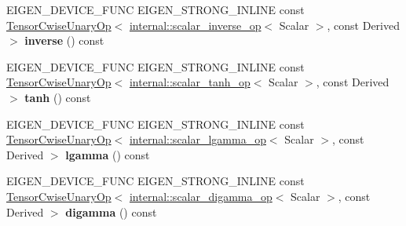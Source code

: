 \begin{DoxyCompactItemize}
\mbox{\label{class_eigen_1_1_tensor_base_3_01_derived_00_01_read_only_accessors_01_4_a6001679417b6e053206f7a92e91435bb}} 
E\+I\+G\+E\+N\+\_\+\+D\+E\+V\+I\+C\+E\+\_\+\+F\+U\+NC E\+I\+G\+E\+N\+\_\+\+S\+T\+R\+O\+N\+G\+\_\+\+I\+N\+L\+I\+NE const \hyperlink{class_eigen_1_1_tensor_cwise_unary_op}{Tensor\+Cwise\+Unary\+Op}$<$ \hyperlink{struct_eigen_1_1internal_1_1scalar__inverse__op}{internal\+::scalar\+\_\+inverse\+\_\+op}$<$ Scalar $>$, const Derived $>$ {\bfseries inverse} () const
\item 
\mbox{\label{class_eigen_1_1_tensor_base_3_01_derived_00_01_read_only_accessors_01_4_ad78e81fa292b9a37ad3fbef8fae10f6c}} 
E\+I\+G\+E\+N\+\_\+\+D\+E\+V\+I\+C\+E\+\_\+\+F\+U\+NC E\+I\+G\+E\+N\+\_\+\+S\+T\+R\+O\+N\+G\+\_\+\+I\+N\+L\+I\+NE const \hyperlink{class_eigen_1_1_tensor_cwise_unary_op}{Tensor\+Cwise\+Unary\+Op}$<$ \hyperlink{struct_eigen_1_1internal_1_1scalar__tanh__op}{internal\+::scalar\+\_\+tanh\+\_\+op}$<$ Scalar $>$, const Derived $>$ {\bfseries tanh} () const
\item 
\mbox{\label{class_eigen_1_1_tensor_base_3_01_derived_00_01_read_only_accessors_01_4_a4b00d02609dff99eee3608ff7b6dad5d}} 
E\+I\+G\+E\+N\+\_\+\+D\+E\+V\+I\+C\+E\+\_\+\+F\+U\+NC E\+I\+G\+E\+N\+\_\+\+S\+T\+R\+O\+N\+G\+\_\+\+I\+N\+L\+I\+NE const \hyperlink{class_eigen_1_1_tensor_cwise_unary_op}{Tensor\+Cwise\+Unary\+Op}$<$ \hyperlink{struct_eigen_1_1internal_1_1scalar__lgamma__op}{internal\+::scalar\+\_\+lgamma\+\_\+op}$<$ Scalar $>$, const Derived $>$ {\bfseries lgamma} () const
\item 
\mbox{\label{class_eigen_1_1_tensor_base_3_01_derived_00_01_read_only_accessors_01_4_a901513d85dd2da281bbb6f5f682e0b07}} 
E\+I\+G\+E\+N\+\_\+\+D\+E\+V\+I\+C\+E\+\_\+\+F\+U\+NC E\+I\+G\+E\+N\+\_\+\+S\+T\+R\+O\+N\+G\+\_\+\+I\+N\+L\+I\+NE const \hyperlink{class_eigen_1_1_tensor_cwise_unary_op}{Tensor\+Cwise\+Unary\+Op}$<$ \hyperlink{struct_eigen_1_1internal_1_1scalar__digamma__op}{internal\+::scalar\+\_\+digamma\+\_\+op}$<$ Scalar $>$, const Derived $>$ {\bfseries digamma} () const
\item 
\mbox{\label{class_eigen_1_1_tensor_base_3_01_derived_00_01_read_only_accessors_01_4_a3e379aac7e11cc5350d15a4343e527ce}} 

\end{DoxyCompactItemize}
